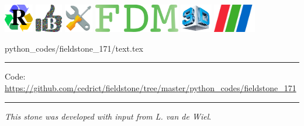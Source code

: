 \noindent
\includegraphics[height=1.25cm]{images/pictograms/replication}
\includegraphics[height=1.25cm]{images/pictograms/benchmark}
\includegraphics[height=1.25cm]{images/pictograms/tools}
\includegraphics[height=1.25cm]{images/pictograms/FDM}
\includegraphics[height=1.25cm]{images/pictograms/3d}
\includegraphics[height=1.25cm]{images/pictograms/paraview}


\begin{flushright} {\tiny {\color{gray} python\_codes/fieldstone\_171/text.tex}} \end{flushright}

%

\par\noindent\rule{\textwidth}{0.4pt}

\begin{center}
\inpython
{\small Code: \url{https://github.com/cedrict/fieldstone/tree/master/python_codes/fieldstone_171}}
\end{center}

\par\noindent\rule{\textwidth}{0.4pt}

{\sl This stone was developed with input from L. van de Wiel}. 

